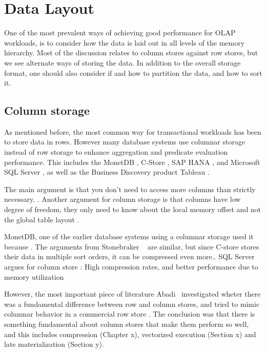 \chapter{Data Layout}
\label{chap:Data Layout}
One of the most prevalent ways of achieving good performance for OLAP workloads, is to consider how the data is laid out in all levels of the memory hierarchy. Most of the discussion relates to column stores against row stores, but we see alternate ways of storing the data. In addition to the overall storage format, one should also consider if and how to partition the data, and how to sort it.
\newpage

\section{Column storage}
\label{sec:Column storage}
As mentioned before, the most common way for transactional workloads has been to store data in rows. However many database systems use columnar storage instead of row storage to enhance aggregation and predicate evaluation performance. This includes the MonetDB \cite{Boncz2002-yj, Boncz2005-wj}, C-Store \cite{Stonebraker2005-qz}, SAP HANA \cite{Farber2012-vh}, and Microsoft SQL Server \cite{Larson2013-mc, noauthor_undated-vq}, as well as the Business Discovery product Tableau \cite{Kamkolkar2015-iq}. 

The main argument is that you don't need to access more columns than strictly necessary. . Another argument for column storage is that columns have low degree of freedom, they only need to know about the local memory offset and not the global table layout \cite{Boncz2005-wj}.

MonetDB, one of the earlier database systems using a columnar storage used it because  \cite{Boncz2002-yj}. The arguments from Stonebraker \ea~\cite{Stonebraker2005-qz} are similar, but since C-store stores their data in multiple sort orders, it can be compressed even more.. SQL Server argues for column store \cite{noauthor_undated-vq}: High compression rates, and better performance due to memory utilization

However, the most important piece of literature Abadi \ea~investigated wheter there was a fundamental difference between row and column stores, and tried to mimic columnar behavior in a commercial row store \cite{Abadi2008-dd} . The conclusion was that there is something fundamental about column stores that make them perform so well, and this includes compression (Chapter x), vectorized execution (Section x) and late materialization (Section y). 


